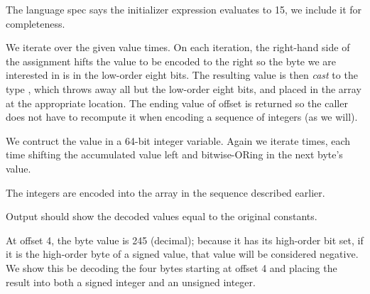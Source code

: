 \begin{topcode}

\begin{bottomcode}


The language spec says the initializer expression
evaluates to 15, we include it for completeness.
\end{bottomcode}

We iterate over the given value  times.
On each iteration, the right-hand side of the
assignment hifts the value to be encoded
to the right so the byte we are interested in is in the low-order eight
bits.  The resulting value is then \emph{cast\/} to the type
, which throws away all but the low-order eight bits, and
placed in the array at the appropriate location.
The ending value of offset is returned so the caller does not have to
recompute it when encoding a sequence of integers (as we will).

We contruct the value in a 64-bit integer variable.
Again we iterate  times, each time shifting the
accumulated value left and bitwise-ORing in the next byte's
value.


\begin{bottomcode}


The integers are encoded into the array in the sequence described earlier.


Output should show the decoded values equal to the original constants.

At offset 4, the byte value is 245 (decimal); because it has
its high-order bit set, if it is the high-order byte of a signed
value, that value will be considered negative.
We show this be decoding the four bytes starting at offset 4 and
placing the result into both a signed integer and an
unsigned integer.
\end{bottomcode}
\end{topcode}

